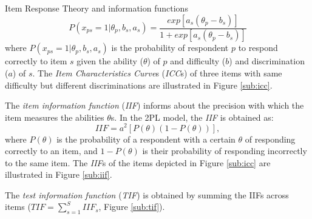 \documentclass[final,t]{beamer}
\begin{document}
\begin{frame}
\begin{columns}[t]
\begin{column}{.45\linewidth}
\begin{block}{\centering Item Response Theory and information functions}
	\begin{equation}\label{eq:2pl}
		P(x_{ps} = 1|\theta_p, b_s, a_s) = \frac{exp[a_s(\theta_p - b_s)]}{1 + exp[a_s(\theta_p - b_s)]}
	\end{equation}
	where $P(x_{ps} = 1|\theta_p, b_s, a_s)$ is the probability of respondent $p$ to respond correctly to item $s$ given the ability ($\theta$) of $p$ and  difficulty ($b$) and discrimination ($a$) of $s$. 
	The \emph{Item Characteristics Curve}s (\emph{ICC}s) of three items with same difficulty but different discriminations are illustrated in Figure \ref{sub:icc}.
	
	The \emph{item information function} (\emph{IIF}) informs about the precision with which the item measures the abilities $\theta$s.
	In the 2PL model, the \emph{IIF} is obtained as: 
	\begin{equation}\label{eq:IIF}
		\mathit{IIF} = a^2[P(\theta)(1-P(\theta))],
	\end{equation}
	where $P(\theta)$ is the probability of a respondent with a certain $\theta$ of responding correctly to an item, and $1 - P(\theta)$ is their probability of  responding incorrectly to the same item. The \emph{IIF}s of the items depicted in Figure \ref{sub:icc} are illustrated in Figure \ref{sub:iif}. 
	
	The \emph{test information function} (\emph{TIF}) is obtained by summing the IIFs across items ($ \mathit{TIF} = \sum_{s=1}^{S} \mathit{IIF}_s$, Figure \ref{sub:tif}). 
	

\end{block}
\end{column}
\end{columns}
\end{frame}
\end{document}
